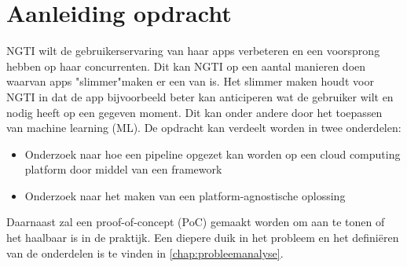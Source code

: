 \section{Aanleiding opdracht}\label{sec:ch1-aanleiding-opdracht}
NGTI wilt de gebruikerservaring van haar apps verbeteren en een voorsprong hebben op haar concurrenten. Dit kan NGTI op een aantal manieren doen waarvan apps "slimmer"\space maken er een van is. Het slimmer maken houdt voor NGTI in dat de app bijvoorbeeld beter kan anticiperen wat de gebruiker wilt en nodig heeft op een gegeven moment. Dit kan onder andere door het toepassen van machine learning (ML). De opdracht kan verdeelt worden in twee onderdelen:

\begin{itemize}
  \item Onderzoek naar hoe een pipeline opgezet kan worden op een cloud computing platform door middel van een framework
  \item Onderzoek naar het maken van een platform-agnostische oplossing
\end{itemize}

Daarnaast zal een proof-of-concept (PoC) gemaakt worden om aan te tonen of het haalbaar is in de praktijk. Een diepere duik in het probleem en het definiëren van de onderdelen is te vinden in \autoref{chap:probleemanalyse}.